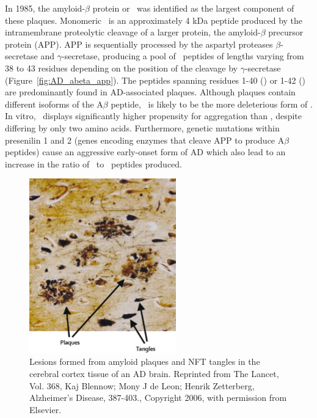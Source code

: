In 1985, the amyloid-$\beta$ protein or \abeta\ was identified as the largest component of these plaques.\cite{Masters:1985wb}
Monomeric \abeta\ is an approximately 4 kDa peptide produced by the intramembrane proteolytic cleavage of a larger protein, the amyloid-$\beta$ precursor protein (APP).\cite{Hardy:2002dh}
APP is sequentially processed by the aspartyl proteases $\beta$-secretase and $\gamma$-secretase, producing a pool of \abeta\ peptides of lengths varying from 38 to 43 residues depending on the position of the cleavage by $\gamma$-secretase (Figure~\ref{fig:AD_abeta_app}).\cite{Gandy:2005dd} The peptides spanning residues 1-40 (\abetaforty) or 1-42 (\abetafortytwo) are predominantly found in AD-associated plaques.\cite{Golde:2000vg,Holtzman:2011gi} Although plaques contain different isoforms of the A$\beta$ peptide, \abetafortytwo\ is likely to be the more deleterious form of \abeta. In vitro, \abetafortytwo\ displays significantly higher propensity for aggregation than \abetaforty, despite differing by only two amino acids.\cite{Barrow:1992vz,Jarrett:1993ti,ElAgnaf:2000vr} Furthermore,  genetic mutations within presenilin 1 and 2 (genes encoding enzymes that cleave APP to produce A$\beta$ peptides) cause an aggressive early-onset form of AD which also lead to an increase in the ratio of \abetafortytwo\ to \abetaforty\ peptides produced.\cite{Hardy:1997tu,KumarSingh:2006kc,Bentahir:2006ih}

\begin{figure}
 \centering
 \includegraphics[width=2.5in]{figures/introduction/AD_tissue_pathology.pdf}
 \caption[AD tissue pathology]{Lesions formed from amyloid plaques and NFT tangles in the cerebral cortex tissue of an AD brain. Reprinted from The Lancet, Vol. 368, Kaj Blennow; Mony J de Leon; Henrik Zetterberg, Alzheimer's Disease, 387-403., Copyright 2006, with permission from Elsevier.}
 \label{fig:AD_tissue_pathology}
\end{figure}

